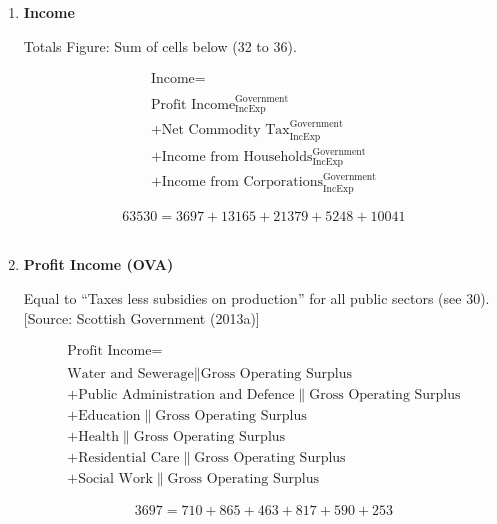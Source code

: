 \begin{enumerate}
\item \textbf {Income}

Totals Figure: Sum of cells below (32 to 36).

\begin{equation}
\begin{split}
\text{Income} =  \\ \\
\text{Profit Income}^\text{Government}_\text{IncExp}\\
+\text{Net Commodity Tax}^\text{Government}_\text{IncExp}\\
+\text{Income from Households}^\text{Government}_\text{IncExp}\\
+\text{Income from Corporations}^\text{Government}_\text{IncExp}
\end{split} \label{eq:2.5.34}
\end{equation}

\begin{equation} \nonumber
63530 = 3697+13165+21379+5248+10041
\end{equation}\\


\item \textbf {Profit Income (OVA)}

Equal to “Taxes less subsidies on production” for all public sectors (see 30). [Source: Scottish Government (2013a)]

\begin{equation}
\begin{split}
\text{Profit Income} =  \\ \\
\text{Water and Sewerage}\|\text{Gross Operating Surplus}\\
+\text{Public Administration and Defence}\|\text{Gross Operating Surplus}\\
+\text{Education}\|\text{Gross Operating Surplus}\\
+\text{Health}\|\text{Gross Operating Surplus}\\
+\text{Residential Care}\|\text{Gross Operating Surplus}\\
+\text{Social Work}\|\text{Gross Operating Surplus}
\end{split} \label{eq:2.5.35}
\end{equation}

\begin{equation} \nonumber
3697 = 710+865+463+817+590+253
\end{equation}\\



\end{enumerate}
